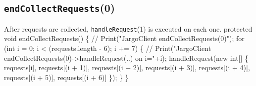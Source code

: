 \documentclass{article}
\def\nwendcode{\endtrivlist \endgroup}
\let\nwdocspar=\par
\begin{document}
\subsection{{\tt{}\protect{}\protect{}endCollectRequests}(0)}
After requests are collected, {\tt{}\protect{}handleRequest}(1) is executed on each one.
\nwenddocs{}\endmoddef{}
protected void endCollectRequests() \{
  // Print("JargoClient endCollectRequests(0)");
  for (int i = 0; i < (requests.length - 6); i += 7) \{
    // Print("JargoClient endCollectRequests(0)->handleRequest(..) on i="+i);
    handleRequest(new int[] \{
      requests[i],
      requests[(i + 1)],
      requests[(i + 2)],
      requests[(i + 3)],
      requests[(i + 4)],
      requests[(i + 5)],
      requests[(i + 6)]
    \});
  \}
\}
\eatline
{}\nwendcode{}\nwdocspar
\end{document}
